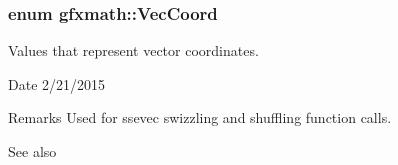 \subsubsection[{Vec\+Coord}]{\setlength{\rightskip}{0pt plus 5cm}enum {\bf gfxmath\+::\+Vec\+Coord}}\label{namespacegfxmath_a8930e63e96e91796ede30a8378b19d0b}


Values that represent vector coordinates. 

\begin{DoxyDate}{Date}
2/21/2015
\end{DoxyDate}
\begin{DoxyRemark}{Remarks}
Used for ssevec swizzling and shuffling function calls.
\end{DoxyRemark}
\begin{DoxySeeAlso}{See also}

\end{DoxySeeAlso}
